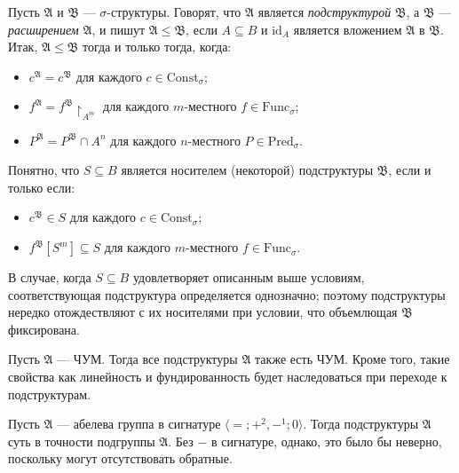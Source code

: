 \documentclass[12pt,a4paper]{article}
\newcommand{\Pred}{\ensuremath{\mathrm{Pred}}\xspace}
\newcommand{\Func}{\ensuremath{\mathrm{Func}}\xspace}
\newcommand{\Const}{\ensuremath{\mathrm{Const}}\xspace}
\newcommand{\id}{\ensuremath{\mathrm{id}}\xspace}
\begin{document}
    \begin{definition}
        Пусть $\mathfrak{A}$ и $\mathfrak{B}$ --- $\sigma$-структуры. Говорят, что $\mathfrak{A}$ является \emph{подструктурой} $\mathfrak{B}$, а $\mathfrak{B}$ --- \emph{расширением} $\mathfrak{A}$, и пишут $\mathfrak{A} \leqslant \mathfrak{B}$, если $A \subseteq B$ и $\id_A$ является вложением $\mathfrak{A}$ в $\mathfrak{B}$. Итак, $\mathfrak{A} \leqslant \mathfrak{B}$ тогда и только тогда, когда:
        \begin{itemize}
            \item $c^\mathfrak{A} = c^\mathfrak{B}$ для каждого $c \in \Const_\sigma$;
            \item $f^\mathfrak{A} = f^\mathfrak{B} \upharpoonright_{A^m}$ для каждого $m$-местного $f \in \Func_\sigma$;
            \item $P^\mathfrak{A} = P^\mathfrak{B} \cap A^n$ для каждого $n$-местного $P \in \Pred_\sigma$.
        \end{itemize}
        Понятно, что $S \subseteq B$ является носителем (некоторой) подструктуры $\mathfrak{B}$, если и только если:
        \begin{itemize}
            \item $c^\mathfrak{B} \in S$ для каждого $c \in \Const_\sigma$;
            \item $f^\mathfrak{B}[S^m] \subseteq S$ для каждого $m$-местного $f \in \Func_\sigma$.
        \end{itemize}
    \end{definition}

    \begin{remark*}
        В случае, когда $S \subseteq B$ удовлетворяет описанным выше условиям, соответствующая подструктура определяется однозначно; поэтому подструктуры нередко отождествляют с их носителями при условии, что объемлющая $\mathfrak{B}$ фиксирована.
    \end{remark*}

    \begin{example}
        Пусть $\mathfrak{A}$ --- ЧУМ. Тогда все подструктуры $\mathfrak{A}$ также есть ЧУМ. Кроме того, такие свойства как линейность и фундированность будет наследоваться при переходе к подструктурам.
    \end{example}

    \begin{example}
        Пусть $\mathfrak{A}$ --- абелева группа в сигнатуре $\langle =; +^2, -^1; 0 \rangle$. Тогда подструктуры $\mathfrak{A}$ суть в точности подгруппы $\mathfrak{A}$. Без $-$ в сигнатуре, однако, это было бы неверно, поскольку могут отсутствовать обратные.
    \end{example}
\end{document}
